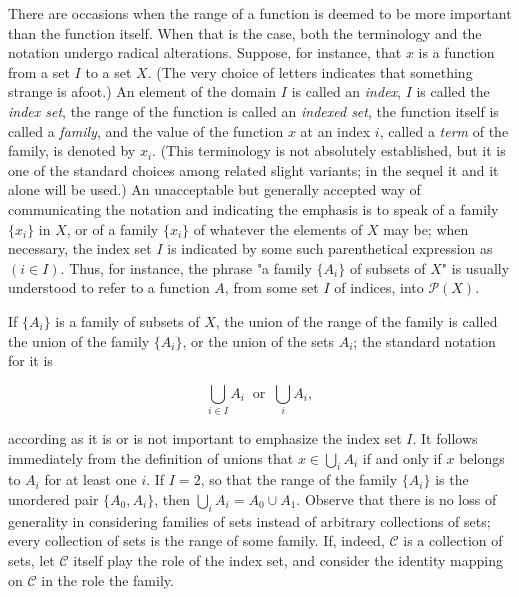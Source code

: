 There are occasions when the range of a function is deemed to be more important than the function itself. When that is the case, both the terminology and the notation undergo radical alterations. Suppose, for instance, that $x$ is a function from a set $I$ to a set $X$. (The very choice of letters indicates that something strange is afoot.) An element of the domain $I$ is called an \textit{index}, $I$ is called the \textit{index set}, the range of the function is called an \textit{indexed set}, the function itself is called a \textit{family}, and the value of the function $x$ at an index $i$, called a \textit{term} of the family, is denoted by $x_{i}$. (This terminology is not absolutely established, but it is one of the standard choices among related slight variants; in the sequel it and it alone will be used.) An unacceptable but generally accepted way of communicating the notation and indicating the emphasis is to speak of a family $\{ x_{i}  \}$ in $X$, or of a family $\{ x_{i} \}$ of whatever the elements of $X$ may be; when necessary, the index set $I$ is indicated by some such parenthetical expression as $(i \in I)$. Thus, for instance, the phrase "a family $\{ A_{i} \}$ of subsets of $X$" is usually understood to refer to a function $A$, from some set $I$ of indices, into $\mathcal{P}(X)$. 

If $ \{ A_{i} \}$ is a family of subsets of $X$, the union of the range of the family is called the union of the family $\{ A_{i} \}$, or the union of the sets $A_{i}$; the standard notation for it is

\begin{equation*}
\bigcup_{i \in I}A_{i} \: \text{ or } \: \bigcup_{i}A_{i},
\end{equation*}

according as it is or is not important to emphasize the index set $I$. It follows immediately from the definition of unions that $x \in \bigcup_{i} A_{i}$ if and only if $x$ belongs to $A_{i}$ for at least one $i$. If $I = 2$, so that the range of the family $\{ A_{i} \}$ is the unordered pair $\{ A_{0}, A_{i} \} $, then $\bigcup_{i}A_{i} =  A_{0} \cup A_{1}$. Observe that there is no loss of generality in considering families of sets instead of arbitrary collections of sets; every collection of sets is the range of some family. If, indeed, $\mathcal{C}$ is a collection of sets, let $\mathcal{C}$ itself play the role of the index set, and consider the identity mapping on $\mathcal{C}$ in the role the family. 

